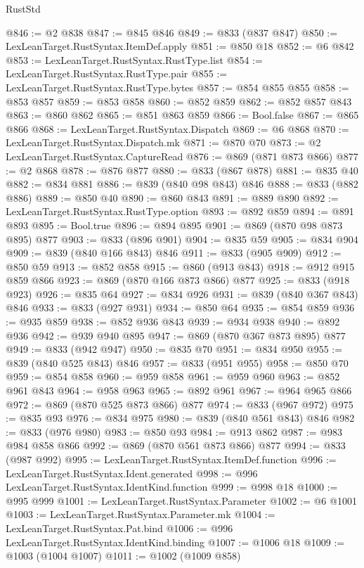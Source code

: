 \begin{lexlean}{RustStd}
\begin{coremodule}
@846 := @2 @838
@847 := @845 @846
@849 := @833 (@837 @847)
@850 := LexLeanTarget.RustSyntax.ItemDef.apply
@851 := @850 @18
@852 := @6 @842
@853 := LexLeanTarget.RustSyntax.RustType.list
@854 := LexLeanTarget.RustSyntax.RustType.pair
@855 := LexLeanTarget.RustSyntax.RustType.bytes
@857 := @854 @855 @855
@858 := @853 @857
@859 := @853 @858
@860 := @852 @859
@862 := @852 @857 @843
@863 := @860 @862
@865 := @851 @863 @859
@866 := Bool.false
@867 := @865 @866
@868 := LexLeanTarget.RustSyntax.Dispatch
@869 := @6 @868
@870 := LexLeanTarget.RustSyntax.Dispatch.mk
@871 := @870 @70
@873 := @2 LexLeanTarget.RustSyntax.CaptureRead
@876 := @869 (@871 @873 @866)
@877 := @2 @868
@878 := @876 @877
@880 := @833 (@867 @878)
@881 := @835 @40
@882 := @834 @881
@886 := @839 (@840 @98 @843) @846
@888 := @833 (@882 @886)
@889 := @850 @40
@890 := @860 @843
@891 := @889 @890
@892 := LexLeanTarget.RustSyntax.RustType.option
@893 := @892 @859
@894 := @891 @893
@895 := Bool.true
@896 := @894 @895
@901 := @869 (@870 @98 @873 @895) @877
@903 := @833 (@896 @901)
@904 := @835 @59
@905 := @834 @904
@909 := @839 (@840 @166 @843) @846
@911 := @833 (@905 @909)
@912 := @850 @59
@913 := @852 @858
@915 := @860 (@913 @843)
@918 := @912 @915 @859 @866
@923 := @869 (@870 @166 @873 @866) @877
@925 := @833 (@918 @923)
@926 := @835 @64
@927 := @834 @926
@931 := @839 (@840 @367 @843) @846
@933 := @833 (@927 @931)
@934 := @850 @64
@935 := @854 @859
@936 := @935 @859
@938 := @852 @936 @843
@939 := @934 @938
@940 := @892 @936
@942 := @939 @940 @895
@947 := @869 (@870 @367 @873 @895) @877
@949 := @833 (@942 @947)
@950 := @835 @70
@951 := @834 @950
@955 := @839 (@840 @525 @843) @846
@957 := @833 (@951 @955)
@958 := @850 @70
@959 := @854 @858
@960 := @959 @858
@961 := @959 @960
@963 := @852 @961 @843
@964 := @958 @963
@965 := @892 @961
@967 := @964 @965 @866
@972 := @869 (@870 @525 @873 @866) @877
@974 := @833 (@967 @972)
@975 := @835 @93
@976 := @834 @975
@980 := @839 (@840 @561 @843) @846
@982 := @833 (@976 @980)
@983 := @850 @93
@984 := @913 @862
@987 := @983 @984 @858 @866
@992 := @869 (@870 @561 @873 @866) @877
@994 := @833 (@987 @992)
@995 := LexLeanTarget.RustSyntax.ItemDef.function
@996 := LexLeanTarget.RustSyntax.Ident.generated
@998 := @996 LexLeanTarget.RustSyntax.IdentKind.function
@999 := @998 @18
@1000 := @995 @999
@1001 := LexLeanTarget.RustSyntax.Parameter
@1002 := @6 @1001
@1003 := LexLeanTarget.RustSyntax.Parameter.mk
@1004 := LexLeanTarget.RustSyntax.Pat.bind
@1006 := @996 LexLeanTarget.RustSyntax.IdentKind.binding
@1007 := @1006 @18
@1009 := @1003 (@1004 @1007)
@1011 := @1002 (@1009 @858)

\end{coremodule}
\end{lexlean}
